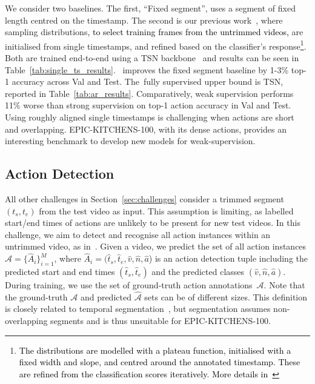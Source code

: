\documentclass[twocolumn]{svjour3}          \smartqed
\newcommand{\chParagraph}[1]{\noindent {\textbf{#1.}} \hspace{6pt}}
\newcommand{\edits}[1]{\textcolor{black}{#1}}
\newcommand {\newDataset} {EPIC-KITCHENS-100}
\begin{document}
\chParagraph{Baselines and Results} 
We consider two baselines. 
The first, ``Fixed segment'', uses a segment of fixed length centred on the timestamp. 
The second is our previous work~\cite{Moltisanti_2019_CVPR}, where sampling distributions\edits{, to select training frames from the untrimmed videos,} are initialised from single timestamps, and refined based on the classifier's response\footnote{\edits{The distributions are modelled with a plateau function, initialised with a fixed width and slope, and centred around the annotated timestamp.
These are refined from the classification scores iteratively. More details in~\cite{Moltisanti_2019_CVPR}}}.
Both are trained end-to-end using a TSN backbone~\cite{wang2016tsn} and results can be seen in Table~\ref{tab:single_ts_results}. \cite{Moltisanti_2019_CVPR}~improves the fixed segment baseline by 1-3\% top-1 accuracy across Val and Test. The~fully supervised upper bound is TSN, reported in Table~\ref{tab:ar_results}. Comparatively, weak supervision performs 11\% worse than strong supervision on top-1 action accuracy in Val and Test. 
Using roughly aligned single timestamps is
challenging when actions are short and overlapping. 
\newDataset, with its dense actions, provides an interesting benchmark to develop new models for weak-supervision.

\subsection{Action Detection}
\label{sec:action_detection_challenge}


\chParagraph{Definition}
All other challenges in Section~\ref{sec:challenges} consider a trimmed segment $(t_s, t_e)$ from the test video as input. This assumption is limiting, as labelled start/end times of actions are unlikely to be present for new test videos. In this challenge, we aim to detect and recognise all action instances within an untrimmed video, as in~\cite{caba2015activitynet}. 
Given a video, we predict the set of all action instances $\hat{\mathcal{A}}=\{\hat A_i\}_{i=1}^M$, where $\hat A_i = (\hat t_s, \hat t_e, \hat v, \hat n, \hat{a}$) is an action detection tuple including the predicted start and end times $(\hat t_s, \hat t_e)$ and the predicted classes $(\hat v, \hat n, \hat{a})$. During training, we use the set of ground-truth action annotations~$\mathcal{A}$. Note that the ground-truth $\mathcal{A}$ and predicted $\hat{\mathcal{A}}$ sets can be of different sizes.
This definition is closely related to temporal segmentation~\cite{lea2017temporal}, but segmentation assumes non-overlapping segments and is thus unsuitable for \newDataset{}.
\end{document}
